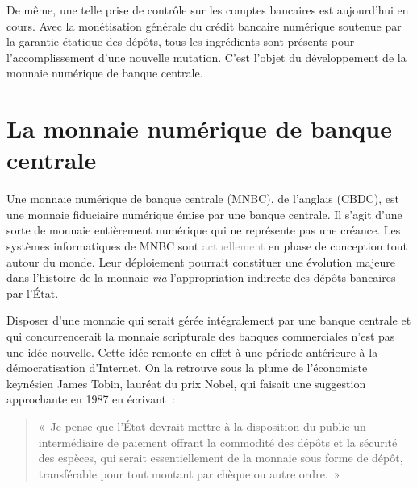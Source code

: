 De même, une telle prise de contrôle sur les comptes bancaires est aujourd'hui en cours. Avec la monétisation générale du crédit bancaire numérique soutenue par la garantie étatique des dépôts, tous les ingrédients sont présents pour l'accomplissement d'une nouvelle mutation. C'est l'objet du développement de la monnaie numérique de banque centrale.

\section*{La monnaie numérique de banque centrale}

Une monnaie numérique de banque centrale (MNBC), de l'anglais  (CBDC), est une monnaie fiduciaire numérique émise par une banque centrale. Il s'agit d'une sorte de monnaie entièrement numérique qui ne représente pas une créance. Les systèmes informatiques de MNBC sont \textcolor{darkgray}{actuellement} en phase de conception tout autour du monde. Leur déploiement pourrait constituer une évolution majeure dans l'histoire de la monnaie \emph{via} l'appropriation indirecte des dépôts bancaires par l'État.


Disposer d'une monnaie qui serait gérée intégralement par une banque centrale et qui concurrencerait la monnaie scripturale des banques commerciales n'est pas une idée nouvelle. Cette idée remonte en effet à une période antérieure à la démocratisation d'Internet. On la retrouve sous la plume de l'économiste keynésien James Tobin, lauréat du prix Nobel, qui faisait une suggestion approchante en 1987 en écrivant~:

\begin{quote}
«~Je pense que l'État devrait mettre à la disposition du public un intermédiaire de paiement offrant la commodité des dépôts et la sécurité des espèces, qui serait essentiellement de la monnaie sous forme de dépôt, transférable pour tout montant par chèque ou autre ordre.~»
\end{quote} %

